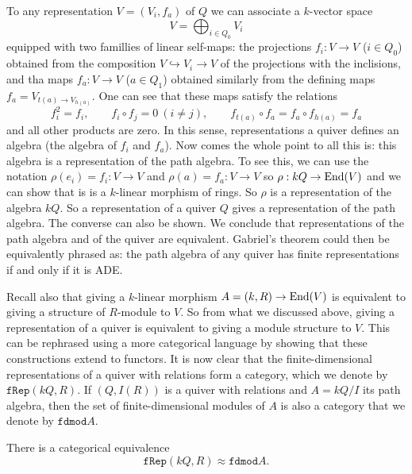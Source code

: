         To any representation $V=(V_i,f_a)$ of $Q$ we can associate a $k$-vector space
        \begin{equation}
            V=\bigoplus_{i \in Q_0}V_i
        \end{equation}
        equipped with two famillies of linear self-maps: the projections $f_i:V\to V$ ($i\in Q_0$) obtained from the composition $V\hookrightarrow V_i\to V$ of the projections with the inclisions, and tha maps $f_a:V\to V$ ($a\in Q_1$) obtained similarly from the defining maps $f_a=V_{t(a)\to V_{h(a)}}$. One can see that these maps satisfy the relations
        \begin{equation}
            f^2_i=f_i,\qquad f_i\circ f_j=0~(i\neq j),\qquad f_{t(a)}\circ f_a=f_a\circ f_{h(a)}=f_a
        \end{equation}
        and all other products are zero. In this sense, representations a quiver defines an algebra (the algebra of $f_i$ and $f_a$). Now comes the whole point to all this is: this algebra is a representation of the path algebra. To see this, we can use the notation $\rho(e_i)=f_i:V\to V$ and $\rho(a)=f_a:V\to V$ so $\rho:kQ\to \text{End}(V)$ and we can show that is is a $k$-linear morphism of rings. So $\rho$ is a representation of the algebra $kQ$. So a representation of a quiver $Q$ gives a representation of the path algebra. The converse can also be shown. We conclude that representations of the path algebra and of the quiver are equivalent. Gabriel's theorem could then be equivalently phrased as: the path algebra of any quiver has finite representations if and only if it is ADE.
        
        Recall also that giving a $k$-linear morphism $A=(k,R)\to\text{End}(V)$ is equivalent to giving a structure of $R$-module to $V$. So from what we discussed above, giving a representation of a quiver is equivalent to giving a module structure to $V$. This can be rephrased using a more categorical language by showing that these constructions extend to functors. It is now clear that the finite-dimensional representations of a quiver with relations form a category, which we denote by $\texttt{fRep}(kQ,R)$. If $(Q,I(R))$ is a quiver with relations and $A=kQ/I$ its path algebra, then the set of finite-dimensional modules of $A$ is also a category that we denote by $\texttt{fdmod}A$.
        \begin{lemma*}
            There is a categorical equivalence
            \begin{equation}
                \texttt{fRep}(kQ,R)\approx\texttt{fdmod}A.
            \end{equation}
        \end{lemma*}
        

